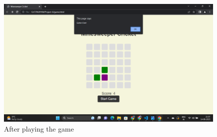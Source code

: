 \documentclass{article}
\begin{document}
\begin{figure}
[H]
   \includegraphics[width=\linewidth]{Screenshot (226).png}
   \caption{After playing the game}
\end{figure}
\maketitle
\end{document}
